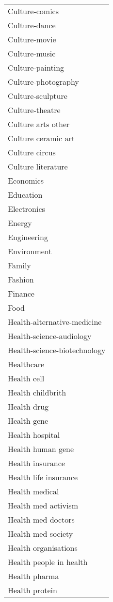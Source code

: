 \documentclass[letterpaper]{article}
\begin{document}
\begin{table*}[ht]
\begin{center}
\begin{tabular}{|l|}
Culture-comics\\
Culture-dance\\
Culture-movie\\
Culture-music\\
Culture-painting\\
Culture-photography\\
Culture-sculpture\\
Culture-theatre\\
Culture arts other\\
Culture ceramic art\\
Culture circus\\
Culture literature \\
Economics\\
Education\\
Electronics\\
Energy\\
Engineering\\
Environment\\
Family\\
Fashion\\
Finance\\
Food\\
Health-alternative-medicine\\
Health-science-audiology\\
Health-science-biotechnology\\
Healthcare\\
Health cell\\
Health childbrith\\
Health drug\\
Health gene\\
Health hospital\\
Health human gene\\
Health insurance\\
Health life insurance\\
Health medical\\
Health med activism\\
Health med doctors\\
Health med society\\
Health organisations\\
Health people in health\\
Health pharma\\
Health protein\\
\hline
\end{tabular}
\end{center}
\label{table:}
\end{table*}\begin{table*}[ht]

\end{table*}
\end{document}
